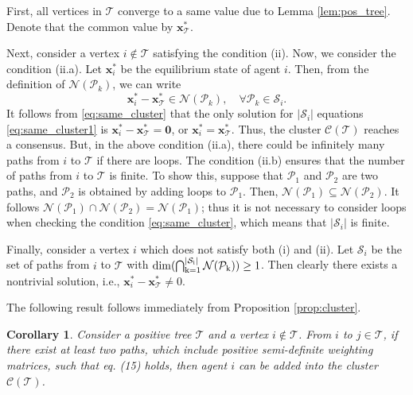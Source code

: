 \documentclass[draftclsnofoot,11pt,onecolumn]{IEEEtran}
\newtheorem{Corollary}{Corollary}
\newcommand{\m}[1]{\mathbf{#1}}
\newcommand{\mc}[1]{\mathcal{#1}}
\begin{document}
\begin{IEEEproof}
First, all vertices in $\mc{T}$ converge to a same value due to Lemma \ref{lem:pos_tree}. Denote that the common value by $\m{x}^*_{\mc{T}}$. 

Next, consider a vertex $i \notin \mc{T}$ satisfying the condition (ii). Now, we consider the condition (ii.a). Let $\m{x}^*_i$ be the equilibrium state of agent $i$. Then, from the definition of $\mc{N}(\mc{P}_k)$, we can write 
\begin{equation}\label{eq:same_cluster1}
\m{x}_i^* - \m{x}_{\mc{T}}^* \in \mc{N}(\mc{P}_k), \quad \forall \mc{P}_k \in \mc{S}_i.
\end{equation}
It follows from \eqref{eq:same_cluster} that the only solution for $|\mc{S}_i|$ equations \eqref{eq:same_cluster1} is $\m{x}_i^* - \m{x}_{\mc{T}}^* = \m{0}$, or $\m{x}_i^* = \m{x}_{\mc{T}}^*$. Thus, the cluster $\mc{C}(\mc{T})$ reaches a consensus. But, in the above condition (ii.a), there could be infinitely many paths from $i$ to $\mc{T}$ if there are loops. The condition (ii.b) ensures that the number of paths from $i$ to $\mc{T}$ is finite. To show this, suppose that $\mc{P}_1$ and $\mc{P}_2$ are two paths, and $\mc{P}_2$ is obtained by adding loops to $\mc{P}_1$. Then, $\mc{N}(\mc{P}_1) \subseteq \mc{N}(\mc{P}_2)$. It follows $\mc{N}(\mc{P}_1) \cap \mc{N}(\mc{P}_2) = \mc{N}(\mc{P}_1)$; thus it is not necessary to consider loops when checking the condition \eqref{eq:same_cluster}, which means that $\vert \mc{S}_i\vert$ is finite. 

Finally, consider a vertex $i$ which does not satisfy both (i) and (ii). Let $\mc{S}_i$ be the set of paths from $i$ to $\mc{T}$ with $\rm{dim} (\bigcap\nolimits_{k=1}^{|\mc{S}_i|} \mc{N}(\mc{P}_k)) \geq 1$. Then clearly there exists a nontrivial solution, i.e., $\m{x}_i^* - \m{x}_{\mc{T}}^* \neq 0$.   
\end{IEEEproof}

The following result follows immediately from Proposition \ref{prop:cluster}.
\begin{Corollary} Consider a positive tree $\mc{T}$ and a vertex $i \notin \mc{T}$. From $i$ to $j \in \mc{T}$, if there exist at least two paths, which include positive semi-definite weighting matrices, such that eq. (15) holds, then agent $i$ can be added into the cluster $\mc{C}(\mc{T})$.
\end{Corollary}
\end{document}

